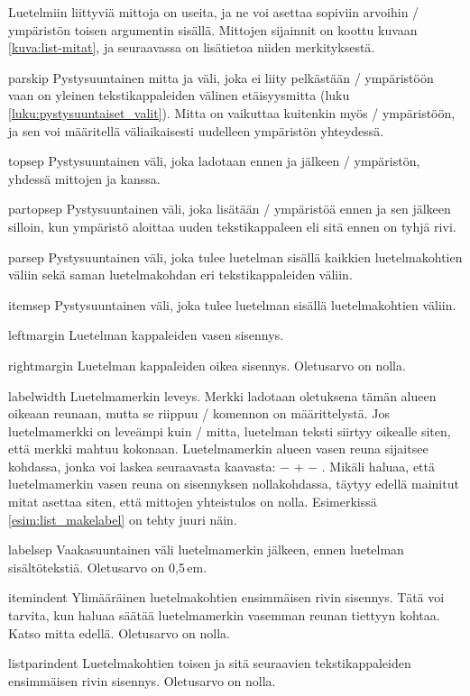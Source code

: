 Luetelmiin liittyviä mittoja on useita, ja ne voi asettaa sopiviin
arvoihin \-/ ympäristön toisen argumentin sisällä.
Mittojen sijainnit on koottu kuvaan \ref{kuva:list-mitat}, ja
seuraavassa on lisätietoa niiden merkityksestä.

\begin{maaritelma}{}
\item [parskip] Pystysuuntainen mitta ja väli, joka ei liity pelkästään
  \-/ ympäristöön vaan on yleinen tekstikappaleiden
  välinen etäisyysmitta (luku \ref{luku:pystysuuntaiset_valit}). Mitta
  on vaikuttaa kuitenkin myös \-/ ympäristöön, ja sen
  voi määritellä väliaikaisesti uudelleen ympäristön yhteydessä.
\item [topsep] Pystysuuntainen väli, joka ladotaan ennen ja jälkeen
  \-/ ympäristön, yhdessä mittojen  ja
   kanssa.
\item [partopsep] Pystysuuntainen väli, joka lisätään
  \-/ ympäristöä ennen ja sen jälkeen silloin, kun
  ympäristö aloittaa uuden tekstikappaleen eli sitä ennen on tyhjä rivi.
\item [parsep] Pystysuuntainen väli, joka tulee luetelman sisällä
  kaikkien luetelmakohtien väliin sekä saman luetelmakohdan eri
  tekstikappaleiden väliin.
\item [itemsep] Pystysuuntainen väli, joka tulee luetelman sisällä
  luetelmakohtien väliin.
\item [leftmargin] Luetelman kappaleiden vasen sisennys.
\item [rightmargin] Luetelman kappaleiden oikea sisennys. Oletusarvo on
  nolla.
\item [labelwidth] Luetelmamerkin leveys. Merkki ladotaan oletuksena
  tämän alueen oikeaan reunaan, mutta se riippuu \-/
  komennon on määrittelystä. Jos luetelmamerkki on leveämpi kuin
  \-/ mitta, luetelman teksti siirtyy oikealle siten,
  että merkki mahtuu kokonaan. Luetelmamerkin alueen vasen reuna
  sijaitsee kohdassa, jonka voi laskea seuraavasta kaavasta:
   −  +  −
  . Mikäli haluaa, että luetelmamerkin vasen reuna on
  sisennyksen nollakohdassa, täytyy edellä mainitut mitat asettaa siten,
  että mittojen yhteistulos on nolla. Esimerkissä
  \ref{esim:list_makelabel} on tehty juuri näin.
\item [labelsep] Vaakasuuntainen väli luetelmamerkin jälkeen, ennen
  luetelman sisältötekstiä. Oletusarvo on 0,5\,em.
\item [itemindent] Ylimääräinen luetelmakohtien ensimmäisen rivin
  sisennys. Tätä voi tarvita, kun haluaa säätää luetelmamerkin vasemman
  reunan tiettyyn kohtaa. Katso mitta  edellä.
  Oletusarvo on nolla.
\item [listparindent] Luetelmakohtien toisen ja sitä seuraavien
  tekstikappaleiden ensimmäisen rivin sisennys. Oletusarvo on nolla.
\end{maaritelma}

